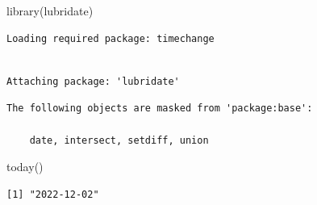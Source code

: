 \documentclass[
  letterpaper,
  DIV=11,
  numbers=noendperiod]{scrartcl}
\newenvironment{Shaded}{\begin{snugshade}}{\end{snugshade}}
\newcommand{\CommentTok}[1]{\textcolor[rgb]{0.37,0.37,0.37}{#1}}
\newcommand{\DecValTok}[1]{\textcolor[rgb]{0.68,0.00,0.00}{#1}}
\newcommand{\DocumentationTok}[1]{\textcolor[rgb]{0.37,0.37,0.37}{\textit{#1}}}
\newcommand{\FunctionTok}[1]{\textcolor[rgb]{0.28,0.35,0.67}{#1}}
\newcommand{\NormalTok}[1]{\textcolor[rgb]{0.00,0.23,0.31}{#1}}
\newcommand{\OtherTok}[1]{\textcolor[rgb]{0.00,0.23,0.31}{#1}}
\newcommand{\SpecialCharTok}[1]{\textcolor[rgb]{0.37,0.37,0.37}{#1}}
\begin{document}
\begin{Shaded}
\begin{Highlighting}[]
\FunctionTok{library}\NormalTok{(lubridate)}
\end{Highlighting}
\end{Shaded}

\begin{verbatim}
Loading required package: timechange
\end{verbatim}

\begin{verbatim}

Attaching package: 'lubridate'
\end{verbatim}

\begin{verbatim}
The following objects are masked from 'package:base':

    date, intersect, setdiff, union
\end{verbatim}

\begin{Shaded}
\begin{Highlighting}[]
\FunctionTok{today}\NormalTok{()}
\end{Highlighting}
\end{Shaded}

\begin{verbatim}
[1] "2022-12-02"
\end{verbatim}

\begin{Shaded}
\end{Shaded}

\begin{Shaded}
\end{Shaded}

\begin{Shaded}
\end{Shaded}
\end{document}
